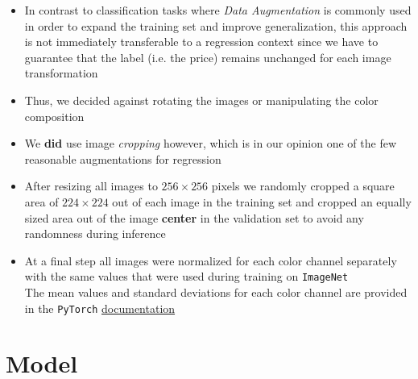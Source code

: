 \documentclass[12pt, letterpaper]{article}
\begin{document}
\begin{itemize}
    \item In contrast to classification tasks where \emph{Data Augmentation} is commonly used in order to expand the training set and improve generalization, this approach is not immediately transferable to a regression context since we have to guarantee that the label (i.e. the price) remains unchanged for each image transformation
    \item Thus, we decided against rotating the images or manipulating the color composition
    \item We \textbf{did} use image \emph{cropping} however, which is in our opinion one of the few reasonable augmentations for regression
    \item After resizing all images to $256 \times 256$ pixels we randomly cropped a square area of $224 \times 224$ out of each image in the training set and cropped an equally sized area out of the image \textbf{center} in the validation set to avoid any randomness during inference
    \item At a final step all images were normalized for each color channel separately with the same values that were used during training on \texttt{ImageNet} \\
          The mean values and standard deviations for each color channel are provided in the \texttt{PyTorch} \href{https://pytorch.org/vision/stable/models.html}{documentation}
\end{itemize}


\section{Model}
\end{document}

